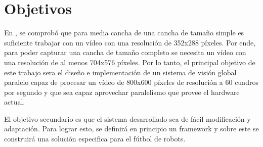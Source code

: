
\section{Objetivos}

En \cite{torres2014}, se comprobó que para media cancha de una cancha de tamaño
simple es suficiente trabajar con un vídeo con una resolución de 352x288
píxeles. Por ende, para poder capturar una cancha de tamaño completo se necesita
un vídeo con una resolución de al menos 704x576 píxeles. Por lo tanto, el
principal objetivo de este trabajo sera el diseño e implementación de un sistema
de visión global paralelo capaz de procesar un vídeo de 800x600 píxeles de
resolución a 60 cuadros por segundo y que sea capaz aprovechar paralelismo que
provee el hardware actual.

El objetivo secundario es que el sistema desarrollado sea de fácil modificación
y adaptación. Para lograr esto, se definirá en principio un framework y sobre
este se construirá una solución especifica para el fútbol de robots.
